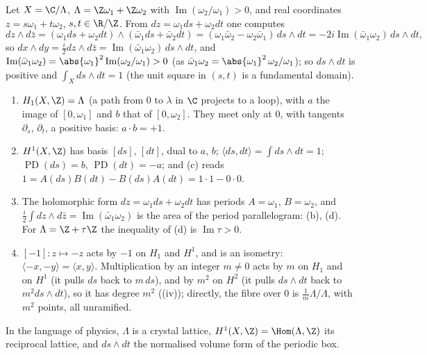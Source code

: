 \begin{example}\label{ex:curves:torus}
Let $X=\C/\Lambda$, $\Lambda=\Z\omega_1+\Z\omega_2$ with $\operatorname{Im}(\omega_2/\omega_1)>0$, and real coordinates $z=s\omega_1+t\omega_2$, $s,t\in\R/\Z$. From
$dz=\omega_1ds+\omega_2dt$ one computes
\[
dz\wedge d\bar z=(\omega_1ds+\omega_2dt)\wedge(\bar\omega_1ds+\bar\omega_2dt)=(\omega_1\bar\omega_2-\omega_2\bar\omega_1)\,ds\wedge dt=-2i\operatorname{Im}(\bar\omega_1\omega_2)\,ds\wedge dt,
\]
so $dx\wedge dy=\frac i2dz\wedge d\bar z=\operatorname{Im}(\bar\omega_1\omega_2)\,ds\wedge dt$, and $\operatorname{Im}(\bar\omega_1\omega_2)=\abs{\omega_1}^2\operatorname{Im}(\omega_2/\omega_1)>0$ (as $\bar\omega_1\omega_2=\abs{\omega_1}^2\,\omega_2/\omega_1$);
so $ds\wedge dt$ is positive and $\int_Xds\wedge dt=1$ (the unit square in $(s,t)$ is a fundamental domain).
\begin{enumerate}[label=(\alph*)]
\item $H_1(X,\Z)=\Lambda$ (a path from $0$ to $\lambda$ in $\C$ projects to a loop), with $a$ the image of $[0,\omega_1]$ and $b$ that of $[0,\omega_2]$. They meet only at $0$, with
tangents $\partial_s$, $\partial_t$, a positive basis: $a\cdot b=+1$.
\item $H^1(X,\Z)$ has basis $[ds]$, $[dt]$, dual to $a$, $b$; $\langle ds,dt\rangle=\int ds\wedge dt=1$; $\operatorname{PD}(ds)=b$, $\operatorname{PD}(dt)=-a$; and
(c) reads $1=A(ds)B(dt)-B(ds)A(dt)=1\cdot1-0\cdot0$.
\item The holomorphic form $dz=\omega_1ds+\omega_2dt$ has periods $A=\omega_1$, $B=\omega_2$, and $\frac i2\int dz\wedge d\bar z=\operatorname{Im}(\bar\omega_1\omega_2)$ is the area of the period
parallelogram: (b), (d). For $\Lambda=\Z+\tau\Z$ the inequality of (d) is $\operatorname{Im}\tau>0$.
\item $[-1]\colon z\mapsto-z$ acts by $-1$ on $H_1$ and $H^1$, and is an isometry: $\langle-x,-y\rangle=\langle x,y\rangle$. Multiplication by an integer $m\ne0$ acts by $m$ on $H_1$ and on
$H^1$ (it pulls $ds$ back to $m\,ds$), and by $m^2$ on $H^2$ (it pulls $ds\wedge dt$ back to $m^2ds\wedge dt$), so it has degree $m^2$
((iv)); directly, the fibre over $0$ is $\frac1m\Lambda/\Lambda$, with $m^2$ points, all unramified.
\end{enumerate}
In the language of physics, $\Lambda$ is a crystal lattice, $H^1(X,\Z)=\Hom(\Lambda,\Z)$ its reciprocal lattice, and $ds\wedge dt$ the normalised volume form of the periodic
box.
\end{example}

